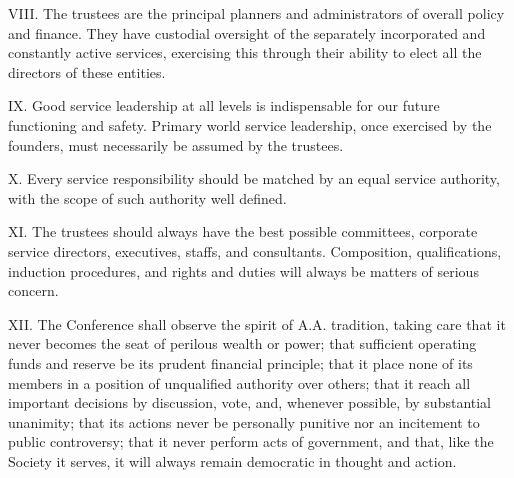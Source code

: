 \begin{biblechapter}
\verse VIII. The trustees are the principal planners and administrators 
    of overall policy and finance.
    They have custodial oversight of the separately incorporated 
    and constantly active services, 
    exercising this through their ability 
    to elect all the directors of these entities.

\verse IX. Good service leadership at all levels is indispensable 
    for our future functioning and safety.
    Primary world service leadership, 
    once exercised by the founders, 
    must necessarily be assumed by the trustees.

\verse X. Every service responsibility 
    should be matched by an equal service authority, 
    with the scope of such authority well defined.

\verse XI. The trustees should always have the best possible committees, 
    corporate service directors, executives, staffs, and consultants.
    Composition, qualifications, induction procedures, 
    and rights and duties will always be matters of serious concern.

\verse XII. The Conference shall observe the spirit of A.A. tradition,
    taking care that it never becomes 
    the seat of perilous wealth or power;
    that sufficient operating funds and reserve 
    be its prudent financial principle;
    that it place none of its members in a position 
    of unqualified authority over others; 
    that it reach all important decisions by 
    discussion, vote, and, whenever possible, by substantial unanimity;
    that its actions never be personally punitive 
    nor an incitement to public controversy;
    that it never perform acts of government, and that, 
    like the Society it serves, 
    it will always remain democratic in thought and action.
\end{biblechapter}

